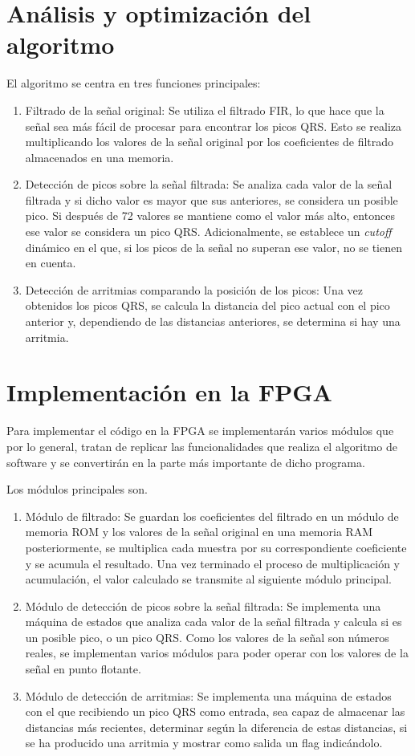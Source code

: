 \section{Análisis y optimización del algoritmo}
El algoritmo se centra en tres funciones principales:
\begin{enumerate}
\item Filtrado de la señal original: Se utiliza el filtrado FIR\cite{FIR}, lo que hace que la señal sea más fácil de procesar para encontrar los picos QRS. Esto se realiza multiplicando los valores de la señal original por los coeficientes de filtrado almacenados en una memoria.
\item Detección de picos sobre la señal filtrada: Se analiza cada valor de la señal filtrada y si dicho valor es mayor que sus anteriores, se considera un posible pico. Si después de 72 valores se mantiene como el valor más alto, entonces ese valor se considera un pico QRS. Adicionalmente, se establece un \textit{cutoff} dinámico en el que, si los picos de la señal no superan ese valor, no se tienen en cuenta.
\item Detección de arritmias comparando la posición de los picos: Una vez obtenidos los picos QRS, se calcula la distancia del pico actual con el pico anterior y, dependiendo de las distancias anteriores, se determina si hay una arritmia.
\end{enumerate}

\section{Implementación en la FPGA}
Para implementar el código en la FPGA se implementarán varios módulos que por lo general, tratan de replicar las funcionalidades que realiza el algoritmo de software y se convertirán en la parte más importante de dicho programa.  

Los módulos principales son.

	\begin{enumerate}
		\item Módulo de filtrado: Se guardan los coeficientes del filtrado en un módulo de memoria ROM y los valores de la señal original en una memoria RAM posteriormente, se multiplica cada muestra por su correspondiente coeficiente y se acumula el resultado. Una vez terminado el proceso de multiplicación y acumulación, el valor calculado se transmite al siguiente módulo principal.
		\item Módulo de detección de picos sobre la señal filtrada: Se implementa una máquina de estados que analiza cada valor de la señal filtrada y calcula si es un posible pico, o un pico QRS. Como los valores de la señal son números reales, se implementan varios módulos para poder operar con los valores de la señal en punto flotante. 
		\item Módulo de detección de arritmias: Se implementa una máquina de estados con el que recibiendo un pico QRS como entrada, sea capaz de almacenar las distancias más recientes, determinar según la diferencia de estas distancias, si se ha producido una arritmia y mostrar como salida un flag indicándolo.
	\end{enumerate}
	
